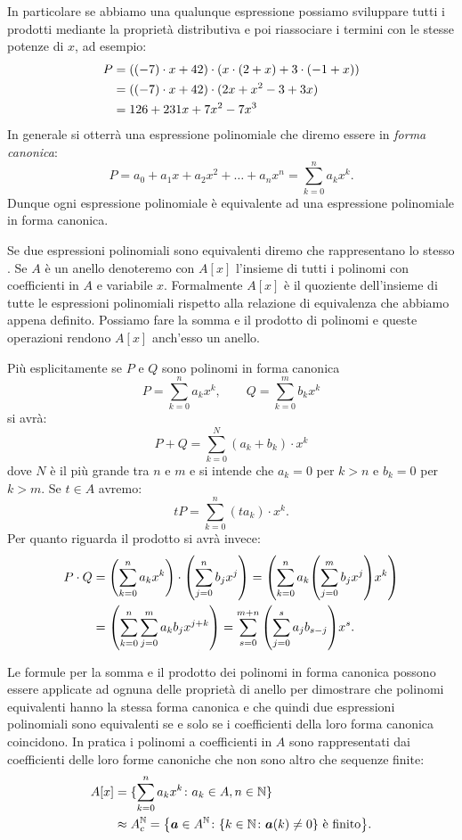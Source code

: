 In particolare se abbiamo una qualunque espressione possiamo sviluppare tutti i prodotti
mediante la proprietà distributiva e poi riassociare i termini 
con le stesse potenze di $x$, ad esempio:
\begin{align*}
P &= {\left( (-7)\cdot x+42 \right)}\cdot(x\cdot (2 + x)
+ 3\cdot(-1+x))\\
&= {\left( (-7)\cdot x + 42 \right)}\cdot (2x+x^2-3+3x) \\
&= 126 + 231 x + 7 x^2 - 7 x^3
\end{align*}
In generale si otterrà una espressione polinomiale che diremo 
essere in \emph{forma canonica}:
\[
  P = a_0 + a_1 x + a_2 x^2 + \dots + a_n x^n
       = \sum_{k=0}^n a_k x^k.
\]
Dunque ogni espressione polinomiale è equivalente ad una 
espressione polinomiale in forma canonica. 

Se due espressioni polinomiali sono equivalenti 
diremo che rappresentano lo stesso .
Se $A$ è un anello denoteremo con 
$A[x]$ \index{$\KK[x]$}%
l'insieme di tutti i polinomi con coefficienti in $A$ e variabile $x$. 
Formalmente $A[x]$ è il quoziente dell'insieme 
di tutte le espressioni polinomiali rispetto alla relazione di equivalenza
che abbiamo appena definito. 
Possiamo fare la somma e il prodotto di polinomi e queste operazioni 
rendono $A[x]$ anch'esso un anello.

Più esplicitamente se $P$ e $Q$ sono polinomi in forma canonica
\[
  P = \sum_{k=0}^n a_k x^k, \qquad Q = \sum_{k=0}^m b_k x^k
\]
si avrà:
\[
  P + Q = \sum_{k=0}^{N} (a_k+b_k) \cdot x^k
\]
dove $N$ è il più grande tra $n$ e $m$ e si intende che $a_k=0$ per $k>n$ e 
$b_k=0$ per $k>m$.
Se $t\in A$ avremo:
\[
  t P = \sum_{k=0}^n (ta_k)\cdot x^k.
\]
Per quanto riguarda il prodotto si avrà invece:
\begin{align*}
  P\cdot Q
  &= {\left( \sum_{k=0}^n a_k x^k \right)}\cdot {\left( \sum_{j=0}^n b_j x^j \right)}
  = {\left( \sum_{k=0}^n a_k {\left( \sum_{j=0}^m b_j x^j \right)} x^k \right)} \\
  &= {\left( \sum_{k=0}^n \sum_{j=0}^m a_k b_j x^{j+k} \right)}
  = \sum_{s=0}^{m+n} {\left( \sum_{j=0}^s a_j b_{s-j} \right)} x^s.
\end{align*}

Le formule per la somma e il prodotto dei polinomi in forma canonica 
possono essere applicate ad ognuna delle proprietà di anello per dimostrare
che polinomi equivalenti hanno la stessa forma canonica e che quindi 
due espressioni polinomiali sono equivalenti se e solo se i coefficienti 
della loro forma canonica coincidono.
In pratica i polinomi a coefficienti in $A$ sono 
rappresentati dai coefficienti delle loro forme canoniche che 
non sono altro che sequenze finite:
\begin{align*}
  A[x] 
  &= \{\sum_{k=0}^n a_k x^k\colon a_k\in A, n\in {\mathbb N}\}\\
  &\approx A^{\mathbb N}_c 
  = {\left\{ \boldsymbol a \in A^{\mathbb N}\colon {\left\{ k\in {\mathbb N}\colon \boldsymbol a(k)\neq 0 \right\}} \text{ è finito} \right\}}.  
\end{align*}

